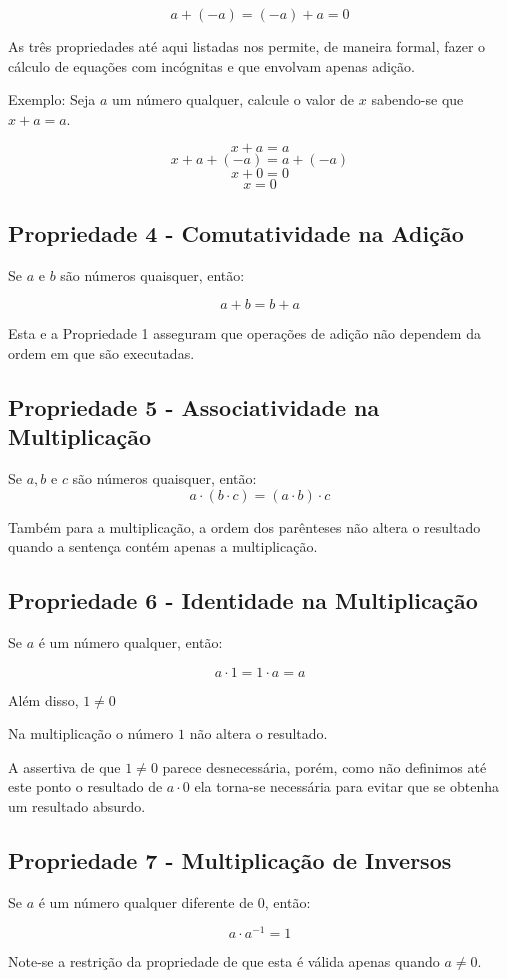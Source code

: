 \documentclass[
    12pt, %
    openright,
    twoside, %
    a4paper, %
    article,
    english,brazil %
]{abntex2}
\begin{document}
$$a+(-a)=(-a)+a=0$$

As três propriedades até aqui listadas nos permite, de maneira formal, fazer o cálculo de equações com incógnitas e que envolvam apenas adição. 

Exemplo: Seja $a$ um número qualquer, calcule o valor de $x$ sabendo-se que $x+a=a$. 

$$x+a=a$$
$$x+a+(-a)=a+(-a)$$
$$x+0=0$$
$$x=0$$

\subsection{Propriedade 4 - Comutatividade na Adição}
Se $a$ e $b$ são números quaisquer, então: 

$$a+b=b+a$$

Esta e a Propriedade 1 asseguram que operações de adição não dependem da ordem em que são executadas.

\subsection{Propriedade 5 - Associatividade na Multiplicação}
Se $a,b$ e $c$ são números quaisquer, então: 
$$ a \cdot (b \cdot c)=(a \cdot b)\cdot c $$

Também para a multiplicação, a ordem dos parênteses não altera o resultado quando a sentença contém apenas a multiplicação.

\subsection{Propriedade 6 - Identidade na Multiplicação}
Se $a$ é um número qualquer, então: 

$$a \cdot 1=1 \cdot a=a$$

Além disso, $1 \neq 0$

Na multiplicação o número $1$ não altera o resultado.

A assertiva de que $1 \neq 0$ parece desnecessária, porém, como não definimos até este ponto o resultado de $a \cdot 0$ ela torna-se necessária para evitar que se obtenha um resultado absurdo.

\subsection{Propriedade 7 - Multiplicação de Inversos}
Se $a$ é um número qualquer diferente de $0$, então: 

$$a \cdot a^{-1}=1$$

Note-se a restrição da propriedade de que esta é válida apenas quando $a \neq 0$.
\end{document}
